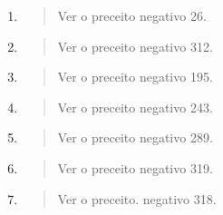 \begin{enumerate}
\def\labelenumi{\arabic{enumi}.}
\setcounter{enumi}{452}
\item
 \begin{quote}
 Ver o preceito negativo 26.
 \end{quote}
\item
 \begin{quote}
 Ver o preceito negativo 312.
 \end{quote}
\item
 \begin{quote}
 Ver o preceito negativo 195.
 \end{quote}
\item
 \begin{quote}
 Ver o preceito negativo 243.
 \end{quote}
\item
 \begin{quote}
 Ver o preceito negativo 289.
 \end{quote}
\item
 \begin{quote}
 Ver o preceito negativo 319.
 \end{quote}
\item
 \begin{quote}
 Ver o preceito. negativo 318.
 \end{quote}
\end{enumerate}

